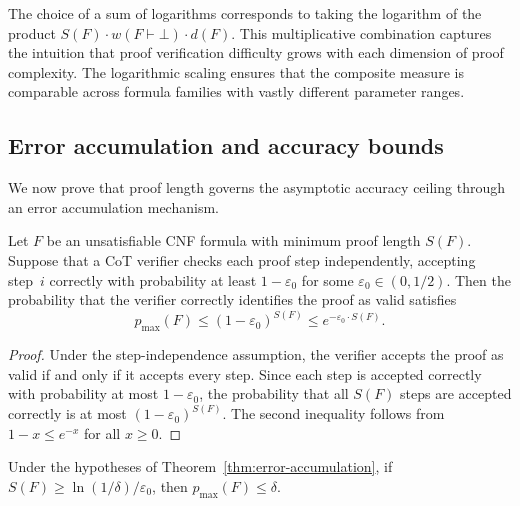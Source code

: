 \begin{remark}\label{rem:composite}
The choice of a sum of logarithms corresponds to taking the logarithm of the
product $S(F) \cdot w(F \vdash \bot) \cdot d(F)$.  This multiplicative
combination captures the intuition that proof verification difficulty grows
with each dimension of proof complexity.  The logarithmic scaling ensures that
the composite measure is comparable across formula families with vastly
different parameter ranges.
\end{remark}

\subsection{Error accumulation and accuracy bounds}\label{sec:error}

We now prove that proof length governs the asymptotic accuracy ceiling through
an error accumulation mechanism.

\begin{theorem}\label{thm:error-accumulation}
Let $F$ be an unsatisfiable CNF formula with minimum proof length $S(F)$.
Suppose that a CoT verifier checks each proof step independently, accepting
step~$i$ correctly with probability at least $1 - \varepsilon_0$ for some
$\varepsilon_0 \in (0, 1/2)$.  Then the probability that the verifier
correctly identifies the proof as valid satisfies
\begin{equation}\label{eq:error-bound}
p_{\max}(F) \le (1 - \varepsilon_0)^{S(F)} \le e^{-\varepsilon_0 \cdot S(F)}.
\end{equation}
\end{theorem}

\begin{proof}
Under the step-independence assumption, the verifier accepts the proof as valid
if and only if it accepts every step.  Since each step is accepted correctly
with probability at most $1 - \varepsilon_0$, the probability that all $S(F)$
steps are accepted correctly is at most $(1 - \varepsilon_0)^{S(F)}$.  The
second inequality follows from $1 - x \le e^{-x}$ for all $x \ge 0$.
\end{proof}

\begin{corollary}\label{cor:accuracy-length}
Under the hypotheses of Theorem~\ref{thm:error-accumulation}, if
$S(F) \ge \ln(1/\delta) / \varepsilon_0$, then $p_{\max}(F) \le \delta$.
\end{corollary}

